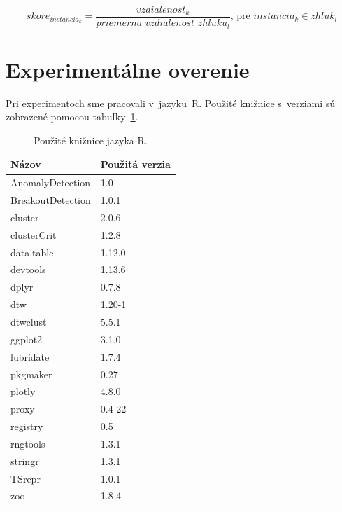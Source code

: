 \documentclass[a4paper,twoside,slovak,12pt,appendix]{article}
\begin{document}
\begin{equation}
  skore_{instancia_k} = \frac{vzdialenost_k}{priemerna\_vzdialenost\_zhluku_l} \text{, pre } instancia_k \in zhluk_l
  \label{eq:instance-score}
\end{equation}



\newpage
\section{Experimentálne overenie}
Pri experimentoch sme pracovali v~jazyku~R. Použité knižnice s~verziami sú
zobrazené pomocou tabuľky~\ref{tab:libraries}.

\begin{table}[ht]
  \centering
  \caption{Použité knižnice jazyka R.}
  \label{tab:libraries}
  \begin{tabular}{|l|l|}
    \hline
    \textbf{Názov}  &   \textbf{Použitá verzia}  \\ \hline
    AnomalyDetection    &   1.0         \\ \hline
    BreakoutDetection   &   1.0.1       \\ \hline
    cluster             &   2.0.6       \\ \hline
    clusterCrit         &   1.2.8       \\ \hline
    data.table          &   1.12.0      \\ \hline
    devtools            &   1.13.6      \\ \hline
    dplyr               &   0.7.8       \\ \hline
    dtw                 &   1.20-1      \\ \hline
    dtwclust            &   5.5.1       \\ \hline
    ggplot2             &   3.1.0       \\ \hline
    lubridate           &   1.7.4       \\ \hline
    pkgmaker            &   0.27        \\ \hline
    plotly              &   4.8.0       \\ \hline
    proxy               &   0.4-22      \\ \hline
    registry            &   0.5         \\ \hline
    rngtools            &   1.3.1       \\ \hline
    stringr             &   1.3.1       \\ \hline
    TSrepr              &   1.0.1       \\ \hline
    zoo                 &   1.8-4       \\ \hline
  \end{tabular}
\end{table}
\end{document}
